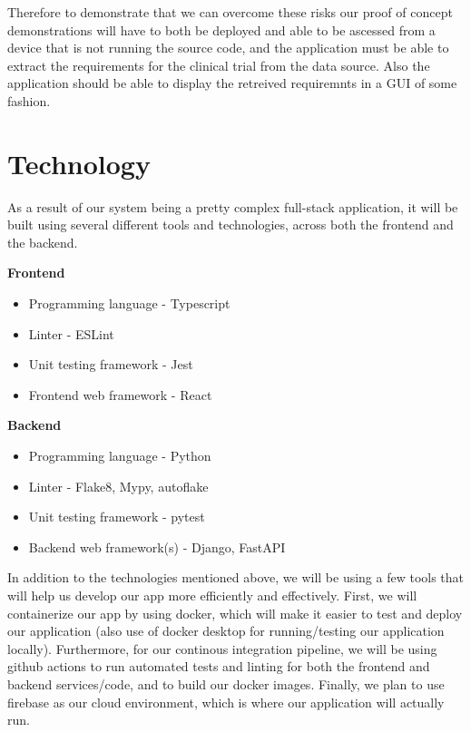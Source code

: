 \documentclass{article}
\begin{document}
Therefore to demonstrate that we can overcome these risks our proof of concept demonstrations will have to both be deployed and able to be ascessed from a device that is not running the source code, and the application must be able to extract the requirements for the clinical trial from the data source. Also the application should be able to display the retreived requiremnts in a GUI of some fashion.

\section{Technology}

As a result of our system being a pretty complex full-stack application, it will be built
using several different tools and technologies, across both the frontend and the backend.
\begin{flushleft}
	\textbf{Frontend}	
\end{flushleft}

\begin{itemize}
	\item Programming language - Typescript
	\item Linter - ESLint
	\item Unit testing framework - Jest
	\item Frontend web framework - React\\
\end{itemize}

\begin{flushleft}
	\textbf{Backend}	
\end{flushleft}

\begin{itemize}
	\item Programming language - Python
	\item Linter - Flake8, Mypy, autoflake
	\item Unit testing framework - pytest
	\item Backend web framework(s) - Django, FastAPI\\
\end{itemize}

In addition to the technologies mentioned above, we will be using a few tools that will help us 
develop our app more efficiently and effectively. First, we will containerize our app
by using docker, which will make it easier to test and deploy our application (also use of docker desktop for running/testing
our application locally). Furthermore, for our continous 
integration pipeline, we will be using github actions to run automated tests and linting for both the frontend and backend 
services/code, and to build our docker images. Finally, we plan to use firebase as our cloud environment, which
is where our application will actually run. \\
\end{document}
